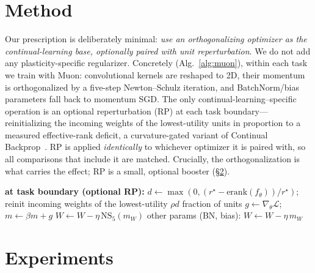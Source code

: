 \documentclass[letterpaper,twocolumn,10pt]{article}
\begin{document}
\section{Method}\label{sec:method}
Our prescription is deliberately minimal: \emph{use an orthogonalizing optimizer as the continual-learning base, optionally paired with unit reperturbation}. We do not add any plasticity-specific regularizer. Concretely (Alg.~\ref{alg:muon}), within each task we train with Muon: convolutional kernels are reshaped to 2D, their momentum is orthogonalized by a five-step Newton--Schulz iteration, and BatchNorm/bias parameters fall back to momentum SGD. The only continual-learning--specific operation is an optional reperturbation (RP) at each task boundary---reinitializing the incoming weights of the lowest-utility units in proportion to a measured effective-rank deficit, a curvature-gated variant of Continual Backprop~\citep{dohare2024}. RP is applied \emph{identically} to whichever optimizer it is paired with, so all comparisons that include it are matched. Crucially, the orthogonalization is what carries the effect; RP is a small, optional booster (\S\ref{sec:exp}).

\begin{algorithm}[t]
\caption{Muon base for continual plasticity (one task)}\label{alg:muon}
\begin{algorithmic}[1]
\State \textbf{at task boundary (optional RP):} $d\!\leftarrow\!\max(0,(r^\star-\mathrm{erank}(f_\theta))/r^\star)$; reinit incoming weights of the lowest-utility $\rho d$ fraction of units
  \State $g\leftarrow\nabla_\theta\mathcal{L}$;\quad $m\leftarrow\beta m+g$
    \State $W\leftarrow W-\eta\,\mathrm{NS}_5(m_W)$ 
  \EndFor
  \State other params (BN, bias): $W\leftarrow W-\eta\,m_W$
\EndFor
\end{algorithmic}
\end{algorithm}

\section{Experiments}\label{sec:exp}
\end{document}
